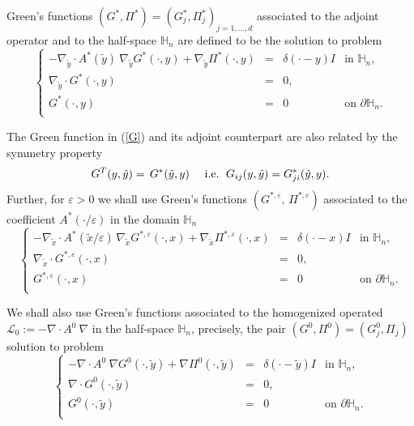 \documentclass[11pt, reqno]{amsart}
\theoremstyle{definition}
\theoremstyle{remark}
\numberwithin{equation}{section}
\begin{document}
	
	\noindent  Green's functions  $(G^*,\Pi^*)=(G_j^*,\Pi_j^*)_{j=1,...,d}$ associated to the adjoint operator and to the half-space $\mathbb{H}_n$ are defined to be the solution to problem 
	\begin{equation}\label{GPj}
		\left\{
		\begin{array}{rcll}
			-\nabla_{\tilde{y}} \cdot A^*(\tilde{y}) \: \nabla_{\tilde{y}} G^*(\cdot,y) +  \nabla_{\tilde{y}} \Pi^*(\cdot,y )&=& \delta(\cdot -y) I  &\mbox{in }\mathbb{H}_n ,\\
			\nabla_{\tilde{y}}\cdot G^*(\cdot,y)&=& 0  ,  &\\
			G^*(\cdot ,y) &=& 0  \quad & \mbox{on } \partial\mathbb{H}_n.\\
		\end{array}
		\right. 
	\end{equation} 
	
	\noindent The Green function in (\ref{G}) and its adjoint counterpart are also related by the symmetry property 
	\begin{equation}\label{sym}
		G^T(y,\tilde{y})\\
		=    \,  G^*(\tilde{y},y) \quad \mbox{ i.e. } \,  G_{ij}(y,\tilde{y})=	G_{ji}^*(\tilde{y},y).
	\end{equation}
		Further, for $\varepsilon>0$ we shall use  Green's functions $(G^{*,\varepsilon},\,\Pi^{*,\varepsilon})$ associated to the coefficient $A^*(\cdot/\varepsilon)$ in the domain $\mathbb{H}_n$
	\begin{equation}\label{system_Greeneps}
		\left\{	\begin{array}{rcll}
			-\nabla_{\tilde{x}}\cdot A^* (\tilde{x}/\varepsilon) \, \nabla_{\tilde{x}} G^{*,\varepsilon}(\cdot,x) +  \nabla_{\tilde{x}} \Pi^{*,\varepsilon}(\cdot,x)&=&  \delta(\cdot -x) I  & \mbox{in }\mathbb{H}_n,\\
			\nabla_{\tilde{x}} \cdot  G^{*,\varepsilon}(\cdot,x)&=& 0 , \\
			 G^{*,\varepsilon}(\cdot,x)&=& 0  \ & \mbox{on } \partial\mathbb{H}_n.\\
		\end{array}
		\right. 
	\end{equation} 
	
	\noindent We shall also use Green's functions associated to the homogenized operated $\mathcal{L}_0:= -\nabla\cdot A^0 \: \nabla $ in the half-space $\mathbb{H}_n$, precisely, the pair  $(G^0,\Pi^0)=(G^0_j,\Pi_j)$ solution to problem 
	\begin{equation}\label{GP0}
		\left\{
		\begin{array}{rcll}
			-\nabla\cdot A^0 \: \nabla G^0(\cdot,\tilde{y}) +  \nabla \Pi^0(\cdot,\tilde{y})&=& \delta(\cdot -\tilde{y}) I   &\mbox{in }\mathbb{H}_n,\\
			\nabla\cdot G^0(\cdot,\tilde{y})&=& 0  ,    &\\
			G^0(\cdot,\tilde{y}) &=& 0 & \mbox{on } \partial\mathbb{H}_n.\\
		\end{array}
		\right. 
	\end{equation}  
	
\end{document}
